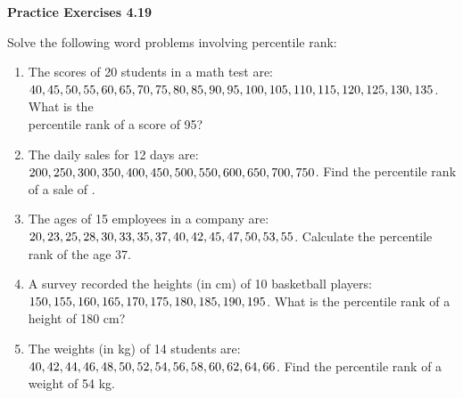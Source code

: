 \vspace{0.3ex}
\noindent\textbf{Practice Exercises 4.19}

\vspace{0.2ex}

Solve the following word problems involving percentile rank:  

\begin{enumerate}
    \item The scores of 20 students in a math test are: \(40, 45, 50, 55, 60, 65, 70, 75,\\ 80,  85, 90, 95, 100, 105, 110, 115, 120, 125, 130, 135\). What is the \\ percentile rank of a score of 95?  
    \item The daily sales for 12 days are: \(200, 250, 300, 350, 400, 450, 500, 550, 600,\\ 650, 700, 750\). Find the percentile rank of a sale of .  
    \item The ages of 15 employees in a company are: \(20, 23, 25, 28, 30, 33, 35,\\ 37, 40, 42, 45, 47, 50, 53, 55\). Calculate the percentile rank of the age 37.  
    \item A survey recorded the heights (in cm) of 10 basketball players: \(150, 155,\\ 160, 165, 170, 175, 180, 185, 190, 195\). What is the percentile rank of a height of 180 cm?  
    \item The weights (in kg) of 14 students are: \(40, 42, 44, 46, 48, 50, 52, 54, 56, 58,\\ 60, 62, 64, 66\). Find the percentile rank of a weight of 54 kg.  
\end{enumerate}
